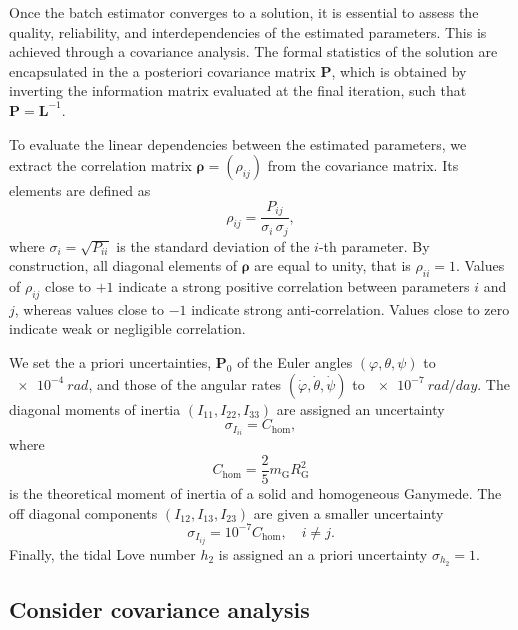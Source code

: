 \documentclass[lineno, pdflatex,sn-mathphys-ay]{sn-jnl}
\theoremstyle{thmstyleone}%
\theoremstyle{thmstyletwo}%
\theoremstyle{thmstylethree}%
\renewcommand{\vec}[1]{\boldsymbol{#1}}
\begin{document}
Once the batch estimator converges to a solution, it is essential to assess the quality, reliability, and interdependencies of the estimated parameters. This is achieved through a covariance analysis. The formal statistics of the solution are encapsulated in the a posteriori covariance matrix $\vec{P}$, which is obtained by inverting the information matrix evaluated at the final iteration, such that ${\vec{P} = \vec{L}^{-1}}$.

To evaluate the linear dependencies between the estimated parameters, we extract the correlation matrix $\vec{\rho} = (\rho_{ij})$ from the covariance matrix. Its elements are defined as
\begin{equation}
	\label{eq:correlation_matrix}
	 \rho_{ij} = \frac{P_{ij}}{\sigma_i\,\sigma_j},
\end{equation}
where ${\sigma_i = \sqrt{P_{ii}}}$ is the standard deviation of the $i$-th parameter.  
By construction, all diagonal elements of $\vec{\rho}$ are equal to unity, that is ${\rho_{ii}=1}$.
Values of $\rho_{ij}$ close to $+1$ indicate a strong positive correlation between parameters $i$ and $j$, whereas values close to $-1$ indicate strong anti-correlation. Values close to zero indicate weak or negligible correlation.


We set the a priori uncertainties, $\vec{P}_{0}$ of the Euler angles $(\varphi,\theta,\psi)$ to
$\SI{e-4}{rad}$, %
and those of the angular rates $(\dot{\varphi},\dot{\theta},\dot{\psi})$ to
$\SI{e-7}{rad/day}$. %
The diagonal moments of inertia $(I_{11}, I_{22}, I_{33})$ are assigned an uncertainty
\begin{equation}
	\sigma_{I_{ii}} = 
	C_{\mathrm{hom}},
\end{equation}
where 
\begin{equation}
C_{\mathrm{hom}} = \frac{2}{5} m_{\mathrm{G}}R_{\mathrm{G}}^2 
\end{equation}
is the theoretical moment of inertia of a solid and homogeneous Ganymede.
The off diagonal components $(I_{12}, I_{13}, I_{23})$ are given a smaller uncertainty
\begin{equation}
	\sigma_{I_{ij}} =
	10^{-7} %
	C_{\mathrm{hom}}, \quad i\neq j.
\end{equation}
Finally, the tidal Love number $h_2$ is assigned an a priori uncertainty 
${\sigma_{h_2} = 1}$. %


\subsection{Consider covariance analysis}\label{sec:consider_covariance}
\end{document}
